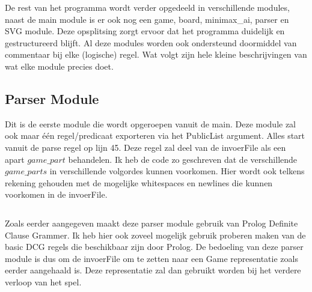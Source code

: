 \documentclass{article}
\begin{document}
De rest van het programma wordt verder opgedeeld in verschillende modules, naast de main module is er ook nog een game, board, minimax\_ai, parser en SVG module. Deze opsplitsing zorgt ervoor dat het programma duidelijk en gestructureerd blijft. Al deze modules worden ook ondersteund doormiddel van commentaar bij elke (logische) regel. Wat volgt zijn hele kleine beschrijvingen van wat elke module precies doet.

\subsection{Parser Module}
Dit is de eerste module die wordt opgeroepen vanuit de main. Deze module zal ook maar één regel/predicaat exporteren via het PublicList argument. Alles start vanuit de parse regel op lijn 45. Deze regel zal deel van de invoerFile als een apart $game\_part$ behandelen. Ik heb de code zo geschreven dat de verschillende $game\_parts$ in verschillende volgordes kunnen voorkomen. Hier wordt ook telkens rekening gehouden met de mogelijke whitespaces en newlines die kunnen voorkomen in de invoerFile.
\inputminted[firstline=42, lastline=56, linenos, breaklines]{prolog}{/Users/Victor/Documents/UGent/3BI/Logisch/Project/project/src/parser.pl}
Zoals eerder aangegeven maakt deze parser module gebruik van Prolog Definite Clause Grammer. Ik heb hier ook zoveel mogelijk gebruik proberen maken van de basic DCG regels die beschikbaar zijn door Prolog. De bedoeling van deze parser module is dus om de invoerFile om te zetten naar een Game representatie zoals eerder aangehaald is. Deze representatie zal dan gebruikt worden bij het verdere verloop van het spel.
\end{document}
